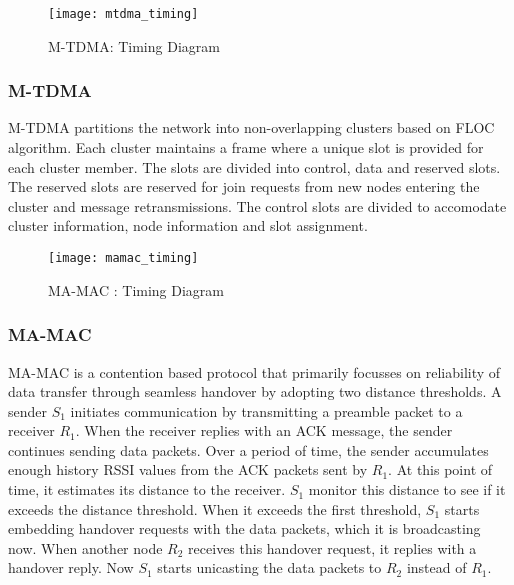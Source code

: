 \begin{figure}[h]{} 
  \begin{center}
		\texttt{[image: mtdma\_timing]}
		\caption{M-TDMA: Timing Diagram}
	\label{fig:mtdma-timing}
  \end{center}
\end{figure}


\subsubsection{M-TDMA}
M-TDMA \cite{m-tdma} partitions the network into non-overlapping clusters based on FLOC algorithm\cite{floc}. Each cluster maintains a frame where a unique slot is provided for each cluster member. The slots are divided into control, data and reserved slots. The reserved slots are reserved for join requests from new nodes entering the cluster and message retransmissions. The control slots are divided to accomodate cluster information, node information and slot assignment. 

\begin{figure}[h]{} 
  \begin{center}
		\texttt{[image: mamac\_timing]}
		\caption{MA-MAC : Timing Diagram}
	\label{fig:mamac-timing}
  \end{center}
\end{figure}


\subsubsection{MA-MAC}
MA-MAC \cite{ma-mac} is a contention based protocol that primarily focusses on reliability of data transfer through seamless handover by adopting two distance thresholds. A sender \emph{$S_1$} initiates communication by transmitting a preamble packet to a receiver \emph{$R_1$}. When the receiver replies with an ACK message, the sender continues sending data packets. Over a period of time, the sender accumulates enough history RSSI values from the ACK packets sent by \emph{$R_1$}. At this point of time, it estimates its distance to the receiver. \emph{$S_1$} monitor this distance to see if it exceeds the distance threshold. When it exceeds the first threshold, \emph{$S_1$} starts embedding handover requests with the data packets, which it is broadcasting now. When another node \emph{$R_2$} receives this handover request, it replies with a handover reply. Now \emph{$S_1$} starts unicasting the data packets to \emph{$R_2$} instead of \emph{$R_1$}.  
 
